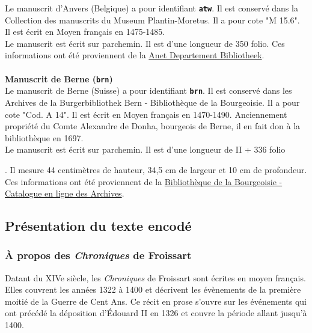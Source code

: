 \documentclass[12pt, a4paper]{article}
\begin{document}
	\indent Le manuscrit d'Anvers (Belgique) a pour identifiant \textbf{\texttt{atw}}. Il est conservé dans la Collection des manuscrits du  Museum Plantin-Moretus. Il a pour cote "M 15.6". Il est écrit en Moyen français en 1475-1485.\\ \indent Le manuscrit est écrit sur parchemin. Il est d'une longueur de 350 folio. Ces informations ont été proviennent de la \href{https://anet.be/record/opacmpm/c:lvd:14057240/F}{Anet Departement Bibliotheek}.\\~\\\noindent \textbf{Manuscrit de Berne (\texttt{brn})}\\
	
	\indent Le manuscrit de Berne (Suisse) a pour identifiant \textbf{\texttt{brn}}. Il est conservé dans les Archives de la  Burgerbibliothek Bern - Bibliothèque de la Bourgeoisie. Il a pour cote "Cod. A 14". Il est écrit en Moyen français en 1470-1490. Anciennement propriété du Comte Alexandre de Donha, bourgeois de Berne, il en fait don à la bibliothèque en 1697.\\ \indent Le manuscrit est écrit sur parchemin. Il est d'une longueur de II + 336 folio
	
	. Il mesure 44 centimètres de hauteur, 34,5 cm de largeur et 10 cm de profondeur. Ces informations ont été proviennent de la \href{http://katalog.burgerbib.ch/detail.aspx?ID=147296}{Bibliothèque de la Bourgeoisie - Catalogue en ligne des Archives}.
	\subsection{Présentation du texte encodé}
	
	
	\subsubsection{À propos des \textit{Chroniques} de Froissart}
	Datant du XIVe siècle, les \textit{Chroniques} de Froissart sont écrites en moyen français. Elles couvrent les années 1322 à 1400 et décrivent les évènements de la première moitié de la Guerre de Cent Ans.
	Ce récit en prose s'ouvre sur les événements qui ont précédé la déposition d'Édouard II en 1326 et couvre la période allant jusqu'à 1400.\\ \indent 
	
\end{document}

